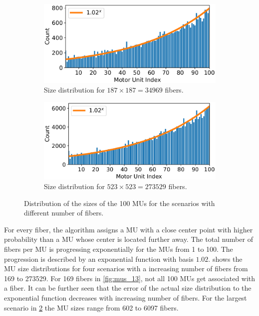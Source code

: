 \begin{figure}
  \begin{subfigure}[t]{0.45\textwidth}%
    \centering%
    \includegraphics[width=\textwidth]{images/results/application/MU_fibre_distribution_187x187_100mus_txt_fiber_distribution.pdf}%
    \caption{Size distribution for $187\times 187 = \num{34969}$ fibers.}%
    \label{fig:mus_187}%
  \end{subfigure} 
  \begin{subfigure}[t]{0.45\textwidth}%
    \centering%
    \includegraphics[width=\textwidth]{images/results/application/MU_fibre_distribution_523x523_100mus_txt_fiber_distribution.pdf}%
    \caption{Size distribution for $523\times 523 = \num{273529}$ fibers.}%
    \label{fig:mus_523}%
  \end{subfigure}   
  \caption{Distribution of the sizes of the 100 MUs for the scenarios with different number of fibers.}%
  \label{fig:mu_sizes_100mus}%
\end{figure}%


For every fiber, the algorithm assigns a MU with a close center point with higher probability than a MU whose center is located further away. The total number of fibers per MU is progressing exponentially for the MUs from 1 to 100. The progression is described by an exponential function with basis $1.02$.  shows the MU size distributions for four scenarios with a increasing number of fibers from \num{169} to \num{273529}. For 169 fibers in \cref{fig:mus_13}, not all 100 MUs get associated with a fiber. It can be further seen that the error of the actual size distribution to the exponential function decreases with increasing number of fibers. For the largest scenario in \cref{fig:mus_523} the MU sizes range from 602 to 6097 fibers.

